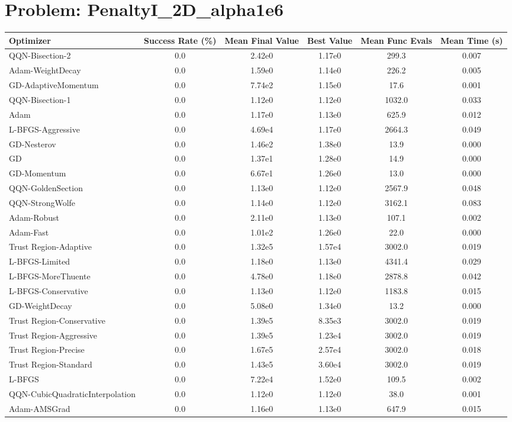 \documentclass{article}
\begin{document}
\section{Problem: PenaltyI\_2D\_alpha1e6}
\begin{longtable}{p{3cm}*{5}{c}}
\toprule
\textbf{Optimizer} & \textbf{Success Rate (\%)} & \textbf{Mean Final Value} & \textbf{Best Value} & \textbf{Mean Func Evals} & \textbf{Mean Time (s)} \\
\midrule
QQN-Bisection-2 & 0.0 & 2.42e0 & 1.17e0 & 299.3 & 0.007 \\
Adam-WeightDecay & 0.0 & 1.59e0 & 1.14e0 & 226.2 & 0.005 \\
GD-AdaptiveMomentum & 0.0 & 7.74e2 & 1.15e0 & 17.6 & 0.001 \\
QQN-Bisection-1 & 0.0 & 1.12e0 & 1.12e0 & 1032.0 & 0.033 \\
Adam & 0.0 & 1.17e0 & 1.13e0 & 625.9 & 0.012 \\
L-BFGS-Aggressive & 0.0 & 4.69e4 & 1.17e0 & 2664.3 & 0.049 \\
GD-Nesterov & 0.0 & 1.46e2 & 1.38e0 & 13.9 & 0.000 \\
GD & 0.0 & 1.37e1 & 1.28e0 & 14.9 & 0.000 \\
GD-Momentum & 0.0 & 6.67e1 & 1.26e0 & 13.0 & 0.000 \\
QQN-GoldenSection & 0.0 & 1.13e0 & 1.12e0 & 2567.9 & 0.048 \\
QQN-StrongWolfe & 0.0 & 1.14e0 & 1.12e0 & 3162.1 & 0.083 \\
Adam-Robust & 0.0 & 2.11e0 & 1.13e0 & 107.1 & 0.002 \\
Adam-Fast & 0.0 & 1.01e2 & 1.26e0 & 22.0 & 0.000 \\
Trust Region-Adaptive & 0.0 & 1.32e5 & 1.57e4 & 3002.0 & 0.019 \\
L-BFGS-Limited & 0.0 & 1.18e0 & 1.13e0 & 4341.4 & 0.029 \\
L-BFGS-MoreThuente & 0.0 & 4.78e0 & 1.18e0 & 2878.8 & 0.042 \\
L-BFGS-Conservative & 0.0 & 1.13e0 & 1.12e0 & 1183.8 & 0.015 \\
GD-WeightDecay & 0.0 & 5.08e0 & 1.34e0 & 13.2 & 0.000 \\
Trust Region-Conservative & 0.0 & 1.39e5 & 8.35e3 & 3002.0 & 0.019 \\
Trust Region-Aggressive & 0.0 & 1.39e5 & 1.23e4 & 3002.0 & 0.019 \\
Trust Region-Precise & 0.0 & 1.67e5 & 2.57e4 & 3002.0 & 0.018 \\
Trust Region-Standard & 0.0 & 1.43e5 & 3.60e4 & 3002.0 & 0.019 \\
L-BFGS & 0.0 & 7.22e4 & 1.52e0 & 109.5 & 0.002 \\
QQN-CubicQuadraticInterpolation & 0.0 & 1.12e0 & 1.12e0 & 38.0 & 0.001 \\
Adam-AMSGrad & 0.0 & 1.16e0 & 1.13e0 & 647.9 & 0.015 \\
\bottomrule
\end{longtable}
\end{document}
